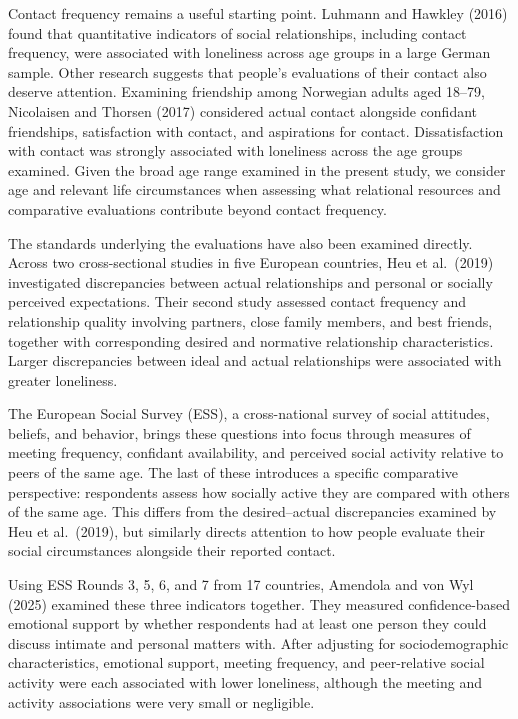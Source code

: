 \documentclass[12pt]{article}
\begin{document}
Contact frequency remains a useful starting point. Luhmann and Hawkley (2016) found that
quantitative indicators of social relationships, including contact frequency, were
associated with loneliness across age groups in a large German sample. Other research
suggests that people's evaluations of their contact also deserve attention. Examining
friendship among Norwegian adults aged 18--79, Nicolaisen and Thorsen (2017) considered
actual contact alongside confidant friendships, satisfaction with contact, and aspirations
for contact. Dissatisfaction with contact was strongly associated with loneliness across
the age groups examined. Given the broad age range examined in the present study, we
consider age and relevant life circumstances when assessing what relational resources and
comparative evaluations contribute beyond contact frequency.

The standards underlying the evaluations have also been examined directly. Across two
cross-sectional studies in five European countries, Heu et al.\ (2019) investigated
discrepancies between actual relationships and personal or socially perceived
expectations. Their second study assessed contact frequency and relationship quality
involving partners, close family members, and best friends, together with corresponding
desired and normative relationship characteristics. Larger discrepancies between ideal
and actual relationships were associated with greater loneliness.

The European Social Survey (ESS), a cross-national survey of social attitudes, beliefs,
and behavior, brings these questions into focus through measures of meeting frequency,
confidant availability, and perceived social activity relative to peers of the same age.
The last of these introduces a specific comparative perspective: respondents assess how
socially active they are compared with others of the same age. This differs from the
desired--actual discrepancies examined by Heu et al.\ (2019), but similarly directs
attention to how people evaluate their social circumstances alongside their reported
contact.

Using ESS Rounds 3, 5, 6, and 7 from 17 countries, Amendola and von Wyl (2025) examined
these three indicators together. They measured confidence-based emotional support by
whether respondents had at least one person they could discuss intimate and personal
matters with. After adjusting for sociodemographic characteristics, emotional support,
meeting frequency, and peer-relative social activity were each associated with lower
loneliness, although the meeting and activity associations were very small or negligible.
\end{document}
